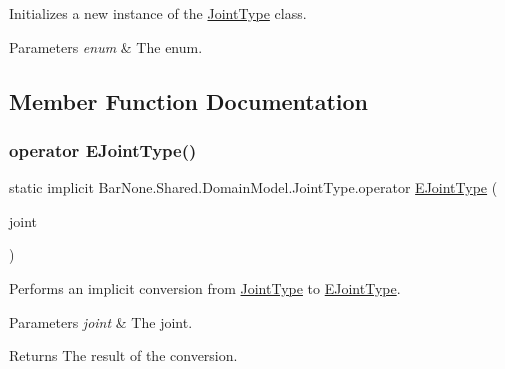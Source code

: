 Initializes a new instance of the \mbox{\hyperlink{class_bar_none_1_1_shared_1_1_domain_model_1_1_joint_type}{Joint\+Type}} class. 


\begin{DoxyParams}{Parameters}
{\em enum} & The enum.\\
\hline
\end{DoxyParams}


\subsection{Member Function Documentation}
\mbox{\label{class_bar_none_1_1_shared_1_1_domain_model_1_1_joint_type_abcaf03f3c1cf173e72f102581775f321}} 
\subsubsection{\texorpdfstring{operator E\+Joint\+Type()}{operator EJointType()}}
{\footnotesize\ttfamily static implicit Bar\+None.\+Shared.\+Domain\+Model.\+Joint\+Type.\+operator \mbox{\hyperlink{namespace_bar_none_1_1_shared_1_1_domain_model_a1aeba40858ef83a78921f013cdabb369}{E\+Joint\+Type}} (\begin{DoxyParamCaption}\item[{\mbox{\hyperlink{class_bar_none_1_1_shared_1_1_domain_model_1_1_joint_type}{Joint\+Type}}}]{joint }\end{DoxyParamCaption})\hspace{0.3cm}{\ttfamily [static]}}



Performs an implicit conversion from \mbox{\hyperlink{class_bar_none_1_1_shared_1_1_domain_model_1_1_joint_type}{Joint\+Type}} to \mbox{\hyperlink{namespace_bar_none_1_1_shared_1_1_domain_model_a1aeba40858ef83a78921f013cdabb369}{E\+Joint\+Type}}. 


\begin{DoxyParams}{Parameters}
{\em joint} & The joint.\\
\hline
\end{DoxyParams}
\begin{DoxyReturn}{Returns}
The result of the conversion. 
\end{DoxyReturn}
\mbox{\label{class_bar_none_1_1_shared_1_1_domain_model_1_1_joint_type_a3b4b62c23008dfbd9e51f5080ac945c5}} 
